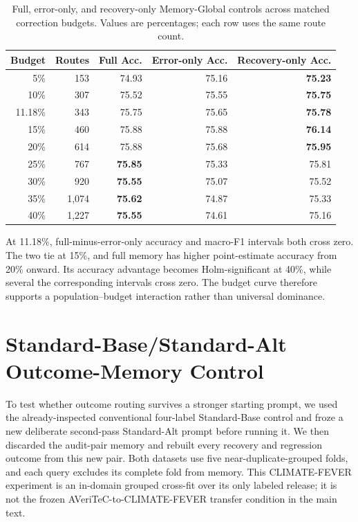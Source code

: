 \documentclass[runningheads]{llncs}
\begin{document}
\begin{table}[t]
\caption{Full, error-only, and recovery-only Memory-Global controls across matched
correction budgets. Values are percentages; each row uses the same route count.}
\label{tab:memory-budget-detail}
\centering\small
\begin{tabular}{rrrrr}
\toprule
Budget & Routes & Full Acc. & Error-only Acc. & Recovery-only Acc. \\
\midrule
5\% & 153 & 74.93 & 75.16 & \textbf{75.23} \\
10\% & 307 & 75.52 & 75.55 & \textbf{75.75} \\
11.18\% & 343 & 75.75 & 75.65 & \textbf{75.78} \\
15\% & 460 & 75.88 & 75.88 & \textbf{76.14} \\
20\% & 614 & 75.88 & 75.68 & \textbf{75.95} \\
25\% & 767 & \textbf{75.85} & 75.33 & 75.81 \\
30\% & 920 & \textbf{75.55} & 75.07 & 75.52 \\
35\% & 1,074 & \textbf{75.62} & 74.87 & 75.33 \\
40\% & 1,227 & \textbf{75.55} & 74.61 & 75.16 \\
\bottomrule
\end{tabular}
\end{table}

At 11.18\%, full-minus-error-only accuracy and macro-F1 intervals both cross
zero. The two tie at 15\%, and full memory has higher point-estimate accuracy
from 20\% onward. Its accuracy advantage becomes Holm-significant at 40\%, while several
the corresponding intervals cross zero. The budget curve therefore supports a
population--budget interaction rather than universal dominance.

\section{Standard-Base/Standard-Alt Outcome-Memory Control}
\label{sec:standard-pair-control}

To test whether outcome routing survives a stronger starting prompt, we used
the already-inspected conventional four-label Standard-Base control and froze
a new deliberate second-pass Standard-Alt prompt before running it. We then discarded the
audit-pair memory and rebuilt every recovery and regression outcome from this
new pair. Both datasets use five near-duplicate-grouped folds, and each query
excludes its complete fold from memory. This CLIMATE-FEVER experiment is an
in-domain grouped cross-fit over its only labeled release; it is not the
frozen AVeriTeC-to-CLIMATE-FEVER transfer condition in the main text.
\end{document}
